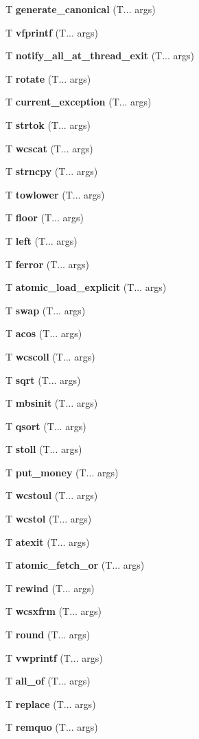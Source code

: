 \begin{DoxyCompactItemize}
T \textbf{ generate\+\_\+canonical} (T... args)
\item 
T \textbf{ vfprintf} (T... args)
\item 
T \textbf{ notify\+\_\+all\+\_\+at\+\_\+thread\+\_\+exit} (T... args)
\item 
T \textbf{ rotate} (T... args)
\item 
T \textbf{ current\+\_\+exception} (T... args)
\item 
T \textbf{ strtok} (T... args)
\item 
T \textbf{ wcscat} (T... args)
\item 
T \textbf{ strncpy} (T... args)
\item 
T \textbf{ towlower} (T... args)
\item 
T \textbf{ floor} (T... args)
\item 
T \textbf{ left} (T... args)
\item 
T \textbf{ ferror} (T... args)
\item 
T \textbf{ atomic\+\_\+load\+\_\+explicit} (T... args)
\item 
T \textbf{ swap} (T... args)
\item 
T \textbf{ acos} (T... args)
\item 
T \textbf{ wcscoll} (T... args)
\item 
T \textbf{ sqrt} (T... args)
\item 
T \textbf{ mbsinit} (T... args)
\item 
T \textbf{ qsort} (T... args)
\item 
T \textbf{ stoll} (T... args)
\item 
T \textbf{ put\+\_\+money} (T... args)
\item 
T \textbf{ wcstoul} (T... args)
\item 
T \textbf{ wcstol} (T... args)
\item 
T \textbf{ atexit} (T... args)
\item 
T \textbf{ atomic\+\_\+fetch\+\_\+or} (T... args)
\item 
T \textbf{ rewind} (T... args)
\item 
T \textbf{ wcsxfrm} (T... args)
\item 
T \textbf{ round} (T... args)
\item 
T \textbf{ vwprintf} (T... args)
\item 
T \textbf{ all\+\_\+of} (T... args)
\item 
T \textbf{ replace} (T... args)
\item 
T \textbf{ remquo} (T... args)
\item 

\end{DoxyCompactItemize}
